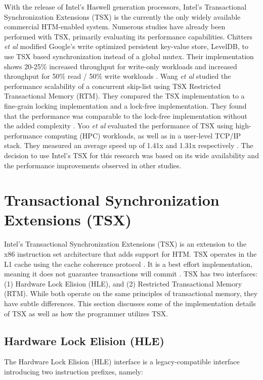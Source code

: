 \documentclass[11pt]{book}
\begin{document}
With the release of Intel's Haswell generation processors, Intel's Transactional
Synchronization Extensions (TSX) is the currently the only widely available commercial
HTM-enabled system.  Numerous studies have already been performed with TSX, primarily
evaluating its performance capabilities.  Chitters \emph{et al} modified Google's write
optimized persistent key-value store, LevelDB, to use TSX based synchronization instead of
a global mutex.  Their implementation shows 20-25\% increased throughput for write-only
workloads and increased throughput for 50\% read / 50\% write workloads
\cite{chitters_tsx}.  Wang \emph{et al} studied the performance scalability of a
concurrent skip-list using TSX Restricted Transactional Memory (RTM).  They compared the
TSX implementation to a fine-grain locking implementation and a lock-free implementation.
They found that the performance was comparable to the lock-free implementation without the
added complexity \cite{wang_tsx}.  Yoo \emph{et al} evaluated the performance of TSX using
high-performance computing (HPC) workloads, as well as in a user-level TCP/IP stack.  They
measured an average speed up of 1.41x and 1.31x respectively \cite{yoo_tsx}.  The decision
to use Intel's TSX for this research was based on its wide availability and the
performance improvements observed in other studies.

\section{Transactional Synchronization Extensions (TSX)}

Intel's Transactional Synchronization Extensions (TSX) is an extension to the x86
instruction set architecture that adds support for HTM.  TSX operates in the L1 cache
using the cache coherence protocol \cite{intel_opt_man}.  It is a best effort
implementation, meaning it does not guarantee transactions will commit
\cite{intel_prog_ref}.  TSX has two interfaces: (1) Hardware Lock Elision (HLE), and (2)
Restricted Transactional Memory (RTM).  While both operate on the same principles of
transactional memory, they have subtle differences.  This section discusses some of the
implementation details of TSX as well as how the programmer utilizes TSX.

\subsection{Hardware Lock Elision (HLE)}\label{sec:hle}

The Hardware Lock Elision (HLE) interface is a legacy-compatible interface introducing two
instruction prefixes, namely: 
\end{document}
